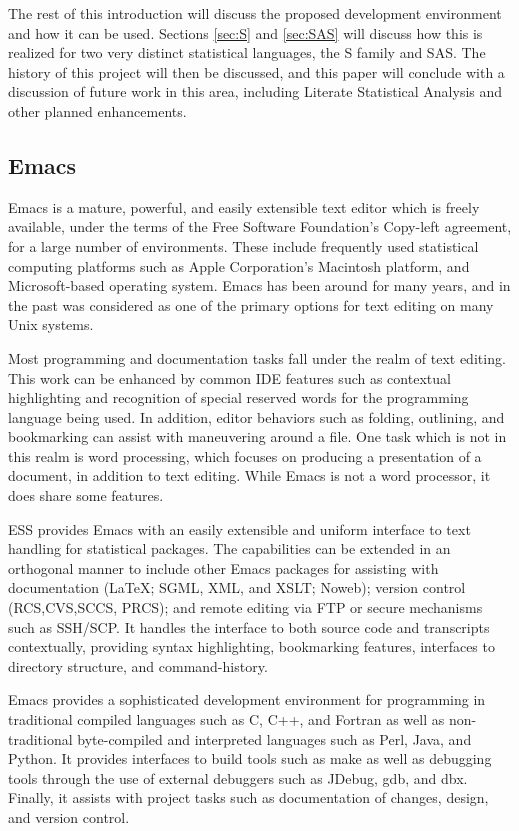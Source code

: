 \documentclass{article}
\begin{document}
The rest of this introduction will discuss the proposed development
environment and how it can be used.  Sections \ref{sec:S} and
\ref{sec:SAS} will discuss how this is realized for two very distinct
statistical languages, the S family and SAS.  The history of this
project will then be discussed, and this paper will conclude with a
discussion of future work in this area, including Literate Statistical
Analysis and other planned enhancements.

\subsection{Emacs}
\label{sec:intro:emacs}

Emacs \citep{RMS:2000} is a mature, powerful, and easily extensible
text editor which is freely available, under the terms of the Free
Software Foundation's Copy-left agreement, for a large number of
environments.  These include frequently used statistical computing
platforms such as Apple Corporation's Macintosh platform, and
Microsoft-based operating system.  Emacs has been around for many
years, and in the past was considered as one of the primary options
for text editing on many Unix systems.

Most programming and documentation tasks fall under the realm of text
editing.  This work can be enhanced by common IDE features such as
contextual highlighting and recognition of special reserved words for
the programming language being used.  In addition, editor behaviors
such as folding, outlining, and bookmarking can assist with
maneuvering around a file.  One task which is not in this realm is
word processing, which focuses on producing a presentation of a
document, in addition to text editing.  While Emacs is not a word
processor, it does share some features.

ESS provides Emacs with an easily extensible and uniform interface to
text handling for statistical packages.  The capabilities can be
extended in an orthogonal manner to include other Emacs packages for
assisting with documentation (\LaTeX; SGML, XML, and XSLT; Noweb);
version control (RCS,CVS,SCCS, PRCS); and remote editing via FTP or
secure mechanisms such as SSH/SCP.  It handles the interface to both
source code and transcripts contextually, providing syntax
highlighting, bookmarking features, interfaces to directory structure,
and command-history.

Emacs provides a sophisticated development environment for programming
in traditional compiled languages such as C, C++, and Fortran as well
as non-traditional byte-compiled and interpreted languages such as
Perl, Java, and Python.  It provides interfaces to build tools such as
make as well as debugging tools through the use of external debuggers
such as JDebug, gdb, and dbx.  Finally, it assists with project tasks
such as documentation of changes, design, and version control.
\end{document}
